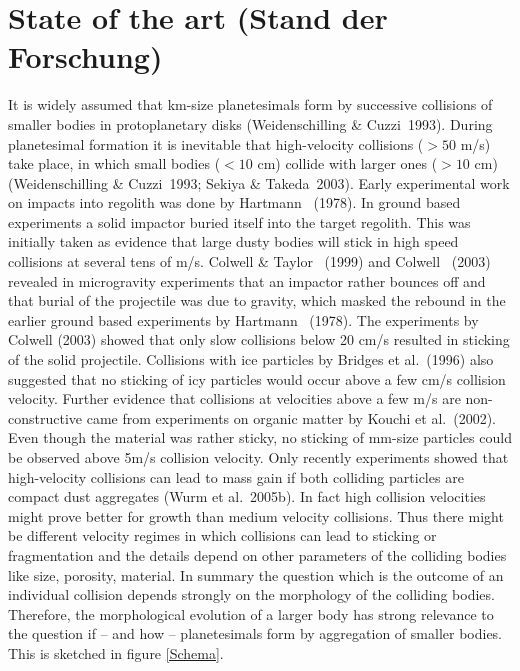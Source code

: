 \section{State of the art (Stand der Forschung)}

It is widely assumed that km-size planetesimals form by successive
collisions of smaller bodies in protoplanetary disks (Weidenschilling \&
Cuzzi~1993).  During planetesimal formation it is inevitable that
high-velocity collisions ($>50$ m/s) take place, in which small bodies ($<
10$ cm) collide with larger ones ($> 10$ cm) (Weidenschilling \&
Cuzzi~1993; Sekiya \& Takeda~2003). Early experimental work on impacts
into regolith was done by Hartmann ~(1978).  In ground based experiments a
solid impactor buried itself into the target regolith. This was initially
taken as evidence that large dusty bodies will stick in high speed
collisions at several tens of m/s. Colwell \& Taylor ~(1999) and Colwell
~(2003) revealed in microgravity experiments that an impactor rather bounces
off and that burial of the projectile was due to gravity, which masked the
rebound in the earlier ground based experiments by Hartmann ~(1978).  The
experiments by Colwell (2003) showed that only slow collisions below 20 cm/s
resulted in sticking of the solid projectile. Collisions with ice particles
by Bridges et al.~(1996) also suggested that no sticking of icy particles
would occur above a few cm/s collision velocity. Further evidence that
collisions at velocities above a few m/s are non-constructive came from
experiments on organic matter by Kouchi et al.~(2002). Even though the
material was rather sticky, no sticking of mm-size particles could be
observed above 5m/s collision velocity.  Only recently experiments showed
that high-velocity collisions can lead to mass gain if both colliding
particles are compact dust aggregates (Wurm et al.~2005b). In fact high
collision velocities might prove better for growth than medium velocity
collisions. Thus there might be different velocity regimes in which
collisions can lead to sticking or fragmentation and the details depend on
other parameters of the colliding bodies like size, porosity, material. In
summary the question which is the outcome of an individual collision depends
strongly on the morphology of the colliding bodies.  Therefore, the
morphological evolution of a larger body has strong relevance to the
question if -- and how -- planetesimals form by aggregation of smaller
bodies. This is sketched in figure \ref{Schema}.

